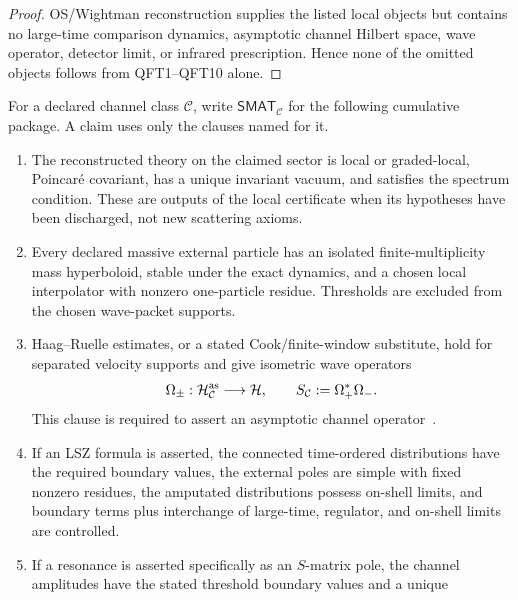 \documentclass[12pt,a4paper]{article}
\begin{document}
\begin{proof}
OS/Wightman reconstruction supplies the listed local objects but contains no
large-time comparison dynamics, asymptotic channel Hilbert space, wave
operator, detector limit, or infrared prescription.  Hence none of the omitted
objects follows from QFT1--QFT10 alone.
\end{proof}

\begin{definition}
\label{p12:def:claim-indexed-smat-package}
For a declared channel class \(\mathcal C\), write
\(\mathsf{SMAT}_{\mathcal C}\) for the following cumulative package.  A claim
uses only the clauses named for it.
\begin{enumerate}[label=\textnormal{(SM\arabic*)},leftmargin=3.2em]
\item The reconstructed theory on the claimed sector is local or graded-local,
      Poincar\'e covariant, has a unique invariant vacuum, and satisfies the
      spectrum condition.  These are outputs of the local certificate when its
      hypotheses have been discharged, not new scattering axioms.
\item Every declared massive external particle has an isolated finite-multiplicity
      mass hyperboloid, stable under the exact dynamics, and a chosen local
      interpolator with nonzero one-particle residue.  Thresholds are excluded
      from the chosen wave-packet supports.
\item Haag--Ruelle estimates, or a stated Cook/finite-window substitute, hold
      for separated velocity supports and give isometric wave operators
      \begin{equation}
      \label{p12:eq:claim-indexed-wave-operators}
      \Omega_\pm:\mathcal H_{\mathcal C}^{\rm as}\longrightarrow\mathcal H,
      \qquad
      S_{\mathcal C}:=\Omega_+^*\Omega_- .
     \end{equation}
      This clause is required to assert an asymptotic channel
      operator~\cite{Haag1996}.
\item If an LSZ formula is asserted, the connected time-ordered distributions
      have the required boundary values, the external poles are simple with
      fixed nonzero residues, the amputated distributions possess on-shell
      limits, and boundary terms plus interchange of large-time, regulator,
      and on-shell limits are controlled.
\item If a resonance is asserted specifically as an \(S\)-matrix pole, the
      channel amplitudes have the stated threshold boundary values and a unique

\end{enumerate}
\end{definition}
\end{document}
